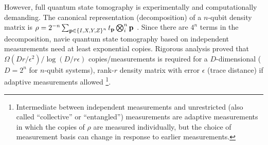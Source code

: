 \documentclass[
reprint,
aps,
pra,
floatfix,
]{revtex4-2}
\theoremstyle{plain}
\theoremstyle{definition}
\newcommand{\dm}{\rho}
\begin{document}
However, full quantum state tomography is experimentally and computationally demanding.
The canonical representation (decomposition) of a $n$-qubit density matrix
is $\dm=2^{-n} \sum_{\vb{p}\in \qty{I,X,Y,Z}^n} t_{\vb{p}} \bigotimes_i^n \vb{p}$  \cite{altepeterPhotonicStateTomography2005}.
Since there are $4^n$ terms in the decomposition, navie quantum state tomography based on independent measurements need at least exponential copies.
Rigorous analysis \cite{haahSampleoptimalTomographyQuantum2017} \cite{odonnellEfficientQuantumTomography2016} proved that $\Omega(Dr/\epsilon^2)/\log(D/r\epsilon)$ copies/measurements is required for a $D$-dimensional ($D=2^n$ for $n$-qubit systems), rank-$r$ density matrix with error $\epsilon$ (trace distance) if adaptive measurements allowed 
\footnote{Intermediate between independent measurements and unrestricted (also called “collective” or “entangled”) measurements are adaptive measurements in which the copies of $\dm$ are measured individually, but the choice of measurement basis can change in response to earlier measurements.}.
\end{document}
